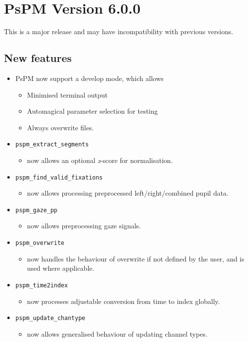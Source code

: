\documentclass[english]{article}
\numberwithin{equation}{section}
\numberwithin{figure}{section}
\begin{document}
\section{PsPM Version 6.0.0}
This is a major release and may have incompatibility with previous versions.
\subsection*{New features}
\begin{itemize}
\item PsPM now support a develop mode, which allows
  \begin{itemize}
  \item Minimised terminal output
  \item Automagical parameter selection for testing
  \item Always overwrite files.
  \end{itemize}
\item \texttt{pspm\_extract\_segments}
  \begin{itemize}
  \item now allows an optional \textit{z}-score for normalisation.
  \end{itemize}
\item \texttt{pspm\_find\_valid\_fixations}
  \begin{itemize}
  \item now allows processing preprocessed left/right/combined pupil data.
  \end{itemize}
\item \texttt{pspm\_gaze\_pp}
  \begin{itemize}
  \item now allows preprocessing gaze signals.
  \end{itemize}
\item \texttt{pspm\_overwrite}
  \begin{itemize}
  \item now handles the behaviour of overwrite if not defined by the user, and is used where applicable.
  \end{itemize}
\item \texttt{pspm\_time2index}
  \begin{itemize}
  \item now processes adjustable conversion from time to index globally.
  \end{itemize}
\item \texttt{pspm\_update\_chantype}
  \begin{itemize}
  \item now allows generalised behaviour of updating channel types.
  \end{itemize}
\end{itemize}
\end{document}
